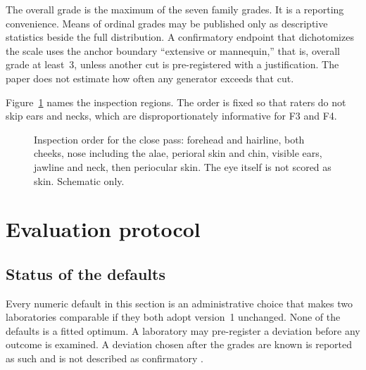 \documentclass[10pt,twocolumn]{article}
\begin{document}
The overall grade is the maximum of the seven family grades. It is a reporting convenience. Means of ordinal grades may be published only as descriptive statistics beside the full distribution. A confirmatory endpoint that dichotomizes the scale uses the anchor boundary ``extensive or mannequin,'' that is, overall grade at least~3, unless another cut is pre-registered with a justification. The paper does not estimate how often any generator exceeds that cut.

Figure~\ref{fig:rois} names the inspection regions. The order is fixed so that raters do not skip ears and necks, which are disproportionately informative for F3 and F4.

\begin{figure}[t]
\centering
{}
\caption{Inspection order for the close pass: forehead and hairline, both cheeks, nose including the alae, perioral skin and chin, visible ears, jawline and neck, then periocular skin. The eye itself is not scored as skin. Schematic only.}
\label{fig:rois}
\end{figure}

\section{Evaluation protocol}
\label{sec:protocol}

\subsection{Status of the defaults}

Every numeric default in this section is an administrative choice that makes two laboratories comparable if they both adopt version~1 unchanged. None of the defaults is a fitted optimum. A laboratory may pre-register a deviation before any outcome is examined. A deviation chosen after the grades are known is reported as such and is not described as confirmatory \cite{nosek2018}.
\end{document}
